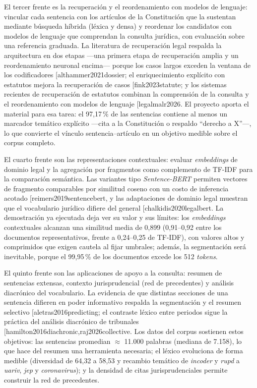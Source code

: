 \documentclass[11pt]{tg_usta}
\makeatletter
\renewcommand{\cite}{\@ifnextchar[{\@tempswatrue\@citex}{\@tempswafalse\@citex[]}}
\makeatother
\begin{document}
El tercer frente es la recuperación y el reordenamiento con modelos de lenguaje: vincular cada sentencia con los artículos de la Constitución que la sustentan mediante búsqueda híbrida (léxica y densa) y reordenar los candidatos con modelos de lenguaje que comprendan la consulta jurídica, con evaluación sobre una referencia graduada. La literatura de recuperación legal respalda la arquitectura en dos etapas ---una primera etapa de recuperación amplia y un reordenamiento neuronal encima--- porque los casos largos exceden la ventana de los codificadores \cite{althammer2021dossier}; el enriquecimiento explícito con estatutos mejora la recuperación de casos \cite{fink2023statute}; y los sistemas recientes de recuperación de estatutos combinan la comprensión de la consulta y el reordenamiento con modelos de lenguaje \cite{legalmalr2026}. El proyecto aporta el material para esa tarea: el 97,17\,\% de las sentencias contiene al menos un marcador temático explícito ---cita a la Constitución o respaldo ``derecho a X''---, lo que convierte el vínculo sentencia--artículo en un objetivo medible sobre el corpus completo.

El cuarto frente son las representaciones contextuales: evaluar \emph{embeddings} de dominio legal y la agregación por fragmentos como complemento de TF-IDF para la comparación semántica. Las variantes tipo \emph{Sentence-BERT} permiten vectores de fragmento comparables por similitud coseno con un costo de inferencia acotado \cite{reimers2019sentencebert}, y las adaptaciones de dominio legal muestran que el vocabulario jurídico difiere del general \cite{chalkidis2020legalbert}. La demostración ya ejecutada deja ver su valor y sus límites: los \emph{embeddings} contextuales alcanzan una similitud media de 0,899 (0,91--0,92 entre los documentos representativos, frente a 0,24--0,25 de TF-IDF), con valores altos y comprimidos que exigen cautela al fijar umbrales; además, la segmentación será inevitable, porque el 99,95\,\% de los documentos excede los 512 \emph{tokens}.

El quinto frente son las aplicaciones de apoyo a la consulta: resumen de sentencias extensas, contexto jurisprudencial (red de precedentes) y análisis diacrónico del vocabulario. La evidencia de que distintas secciones de una sentencia difieren en poder informativo respalda la segmentación y el resumen selectivo \cite{aletras2016predicting}; el contraste léxico entre periodos sigue la práctica del análisis diacrónico de tribunales \cite{hamilton2016diachronic,raj2026collective}. Los datos del corpus sostienen estos objetivos: las sentencias promedian $\approx$ 11.000 palabras (mediana de 7.158), lo que hace del resumen una herramienta necesaria; el léxico evoluciona de forma medible (diversidad de 64,32 a 58,53 y recambio temático de \emph{incoder} y \emph{rupd} a \emph{uariv}, \emph{jep} y \emph{coronavirus}); y la densidad de citas jurisprudenciales permite construir la red de precedentes.
\end{document}
